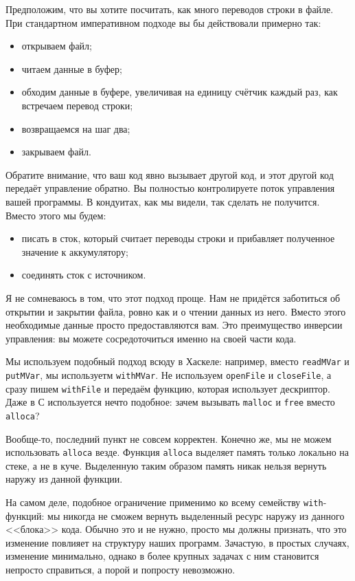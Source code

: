 Предположим, что вы хотите посчитать, как много переводов строки в файле. При
стандартном императивном подходе вы бы действовали примерно так:
\begin{itemize}
\item   открываем файл;
\item   читаем данные в буфер;
\item   обходим данные в буфере, увеличивая на единицу счётчик каждый раз, как встречаем перевод строки;
\item   возвращаемся на шаг два;
\item   закрываем файл.
\end{itemize}
Обратите внимание, что ваш код явно вызывает другой код, и этот другой код
передаёт управление обратно. Вы полностью контролируете поток
управления вашей программы. В кондуитах, как мы видели, так сделать
не получится. Вместо этого мы будем:
\begin{itemize}
\item  писать в сток, который считает переводы строки и прибавляет полученное значение к аккумулятору;
\item  соединять сток с источником.
\end{itemize}
Я не сомневаюсь в том, что этот подход проще. Нам не придётся заботиться об
открытии и закрытии файла, ровно как и о чтении данных из него. Вместо этого необходимые данные
просто предоставляются вам. Это преимущество инверсии управления: вы
можете сосредоточиться именно на своей части кода.

Мы используем подобный подход всюду в Хаскеле: например, вместо \lstinline'readMVar'
и \lstinline'putMVar', мы используетм \lstinline'withMVar'. Не используем
\lstinline'openFile' и \lstinline'closeFile', а сразу пишем \lstinline'withFile'
и передаём функцию, которая использует дескриптор. Даже в С используется нечто
подобное: зачем вызывать \lstinline'malloc' и \lstinline'free' вместо
\lstinline'alloca'?

Вообще-то, последний пункт не совсем корректен. Конечно же, мы не можем использовать
\lstinline'alloca' везде. Функция \lstinline'alloca' выделяет память только локально на
стеке, а не в куче. Выделенную таким образом память никак нельзя вернуть наружу из
данной функции.

На самом деле, подобное ограничение применимо ко всему семейству
\lstinline{with}-функций: мы никогда не сможем вернуть выделенный ресурс наружу из данного
<<блока>> кода. Обычно это и не нужно, просто мы должны признать, что это
изменение повлияет на структуру наших программ. Зачастую, в простых случаях, изменение минимально, однако в более крупных задачах с ним становится непросто справиться,
а порой и попросту невозможно.

